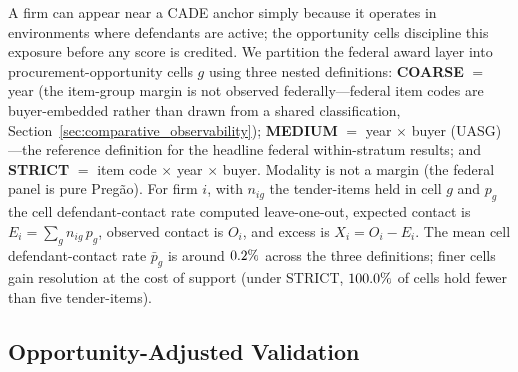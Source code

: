 A firm can appear near a CADE anchor simply because it operates in
environments where defendants are active; the opportunity cells discipline
this exposure before any score is credited. We partition the federal award
layer into procurement-opportunity cells $g$ using three nested
definitions: \textbf{COARSE} $=$ year (the item-group margin is not
observed federally---federal item codes are buyer-embedded rather than
drawn from a shared classification,
Section~\ref{sec:comparative_observability}); \textbf{MEDIUM} $=$ year
$\times$ buyer (UASG)---the reference definition for the headline federal
within-stratum results; and \textbf{STRICT} $=$ item code $\times$ year
$\times$ buyer. Modality is not a margin (the federal panel is pure
Preg\~ao). For firm $i$, with $n_{ig}$ the tender-items held in cell $g$
and $p_g$ the cell defendant-contact rate computed leave-one-out, expected
contact is $E_i=\sum_g n_{ig}\,p_g$, observed contact is $O_i$, and excess
is $X_i=O_i-E_i$. The mean cell defendant-contact rate $\bar p_g$ is around
$0.2\%$ across the three definitions; finer cells gain
resolution at the cost of support (under STRICT,
$100.0\%$ of cells hold fewer than five tender-items).

\subsection{Opportunity-Adjusted Validation}
\label{supp:federal_control_function}

